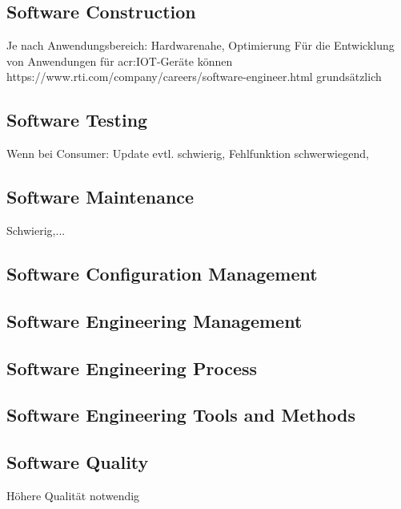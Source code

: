 \subsection{Software Construction}
Je nach Anwendungsbereich: Hardwarenahe, Optimierung
Für die Entwicklung von Anwendungen für \gls{acr:IOT}-Geräte können
https://www.rti.com/company/careers/software-engineer.html grundsätzlich

\subsection{Software Testing}
Wenn bei Consumer: Update evtl. schwierig, Fehlfunktion schwerwiegend,

\subsection{Software Maintenance}
Schwierig,...

\subsection{Software Configuration Management}


\subsection{Software Engineering Management}


\subsection{Software Engineering Process}


\subsection{Software Engineering Tools and Methods}


\subsection{Software Quality}
Höhere Qualität notwendig